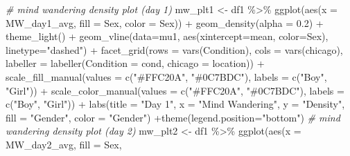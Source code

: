 \documentclass[
  letterpaper,
  DIV=11,
  numbers=noendperiod]{scrartcl}
\newenvironment{Shaded}{\begin{snugshade}}{\end{snugshade}}
\newcommand{\AttributeTok}[1]{\textcolor[rgb]{0.49,0.56,0.16}{#1}}
\newcommand{\CommentTok}[1]{\textcolor[rgb]{0.38,0.63,0.69}{\textit{#1}}}
\newcommand{\FloatTok}[1]{\textcolor[rgb]{0.25,0.63,0.44}{#1}}
\newcommand{\FunctionTok}[1]{\textcolor[rgb]{0.02,0.16,0.49}{#1}}
\newcommand{\NormalTok}[1]{\textcolor[rgb]{0.00,0.44,0.13}{#1}}
\newcommand{\OtherTok}[1]{\textcolor[rgb]{0.00,0.44,0.13}{#1}}
\newcommand{\SpecialCharTok}[1]{\textcolor[rgb]{0.25,0.44,0.63}{#1}}
\newcommand{\StringTok}[1]{\textcolor[rgb]{0.25,0.44,0.63}{#1}}
\begin{document}
\begin{Shaded}
\begin{Highlighting}[]
\CommentTok{\# mind wandering density plot (day 1)}
\NormalTok{mw\_plt1 }\OtherTok{\textless{}{-}}\NormalTok{ df1 }\SpecialCharTok{\%\textgreater{}\%} \FunctionTok{ggplot}\NormalTok{(}\FunctionTok{aes}\NormalTok{(}\AttributeTok{x =}\NormalTok{ MW\_day1\_avg, }\AttributeTok{fill =}\NormalTok{ Sex,}
                   \AttributeTok{color =}\NormalTok{ Sex)) }\SpecialCharTok{+}
  \FunctionTok{geom\_density}\NormalTok{(}\AttributeTok{alpha =} \FloatTok{0.2}\NormalTok{) }\SpecialCharTok{+}
  \FunctionTok{theme\_light}\NormalTok{() }\SpecialCharTok{+}
  \FunctionTok{geom\_vline}\NormalTok{(}\AttributeTok{data=}\NormalTok{mu1, }\FunctionTok{aes}\NormalTok{(}\AttributeTok{xintercept=}\NormalTok{mean, }\AttributeTok{color=}\NormalTok{Sex),}
           \AttributeTok{linetype=}\StringTok{"dashed"}\NormalTok{) }\SpecialCharTok{+}
  \FunctionTok{facet\_grid}\NormalTok{(}\AttributeTok{rows =} \FunctionTok{vars}\NormalTok{(Condition),}
             \AttributeTok{cols =} \FunctionTok{vars}\NormalTok{(chicago),}
             \AttributeTok{labeller =} \FunctionTok{labeller}\NormalTok{(}\AttributeTok{Condition =}\NormalTok{ cond,}
                                 \AttributeTok{chicago =}\NormalTok{ location)) }\SpecialCharTok{+}
  \FunctionTok{scale\_fill\_manual}\NormalTok{(}\AttributeTok{values =} \FunctionTok{c}\NormalTok{(}\StringTok{"\#FFC20A"}\NormalTok{, }\StringTok{"\#0C7BDC"}\NormalTok{), }\AttributeTok{labels =} \FunctionTok{c}\NormalTok{(}\StringTok{"Boy"}\NormalTok{, }\StringTok{"Girl"}\NormalTok{)) }\SpecialCharTok{+}
  \FunctionTok{scale\_color\_manual}\NormalTok{(}\AttributeTok{values =} \FunctionTok{c}\NormalTok{(}\StringTok{"\#FFC20A"}\NormalTok{, }\StringTok{"\#0C7BDC"}\NormalTok{), }\AttributeTok{labels =} \FunctionTok{c}\NormalTok{(}\StringTok{"Boy"}\NormalTok{, }\StringTok{"Girl"}\NormalTok{)) }\SpecialCharTok{+}
  \FunctionTok{labs}\NormalTok{(}\AttributeTok{title =} \StringTok{"Day 1"}\NormalTok{,}
    \AttributeTok{x =} \StringTok{"Mind Wandering"}\NormalTok{, }\AttributeTok{y =} \StringTok{"Density"}\NormalTok{,}
       \AttributeTok{fill =} \StringTok{"Gender"}\NormalTok{, }\AttributeTok{color =} \StringTok{"Gender"}\NormalTok{) }\SpecialCharTok{+}\FunctionTok{theme}\NormalTok{(}\AttributeTok{legend.position=}\StringTok{"bottom"}\NormalTok{)}
\CommentTok{\# mind wandering density plot (day 2)}
\NormalTok{mw\_plt2 }\OtherTok{\textless{}{-}}\NormalTok{ df1 }\SpecialCharTok{\%\textgreater{}\%} \FunctionTok{ggplot}\NormalTok{(}\FunctionTok{aes}\NormalTok{(}\AttributeTok{x =}\NormalTok{ MW\_day2\_avg, }\AttributeTok{fill =}\NormalTok{ Sex,}

\end{Highlighting}
\end{Shaded}
\end{document}
